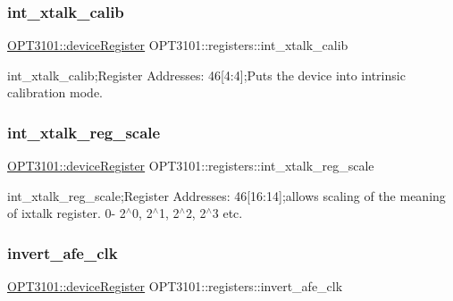 \subsubsection{\texorpdfstring{int\+\_\+xtalk\+\_\+calib}{int\_xtalk\_calib}}
{\footnotesize\ttfamily \mbox{\hyperlink{class_o_p_t3101_1_1device_register}{O\+P\+T3101\+::device\+Register}} O\+P\+T3101\+::registers\+::int\+\_\+xtalk\+\_\+calib}



int\+\_\+xtalk\+\_\+calib;Register Addresses\+: 46\mbox{[}4\+:4\mbox{]};Puts the device into intrinsic calibration mode. 

\mbox{\label{class_o_p_t3101_1_1registers_acff4e2c6f9916202d0e3d82974b15e92}} 
\subsubsection{\texorpdfstring{int\+\_\+xtalk\+\_\+reg\+\_\+scale}{int\_xtalk\_reg\_scale}}
{\footnotesize\ttfamily \mbox{\hyperlink{class_o_p_t3101_1_1device_register}{O\+P\+T3101\+::device\+Register}} O\+P\+T3101\+::registers\+::int\+\_\+xtalk\+\_\+reg\+\_\+scale}



int\+\_\+xtalk\+\_\+reg\+\_\+scale;Register Addresses\+: 46\mbox{[}16\+:14\mbox{]};allows scaling of the meaning of ixtalk register. 0-\/ 2$^\wedge$0, 2$^\wedge$1, 2$^\wedge$2, 2$^\wedge$3 etc. 

\mbox{\label{class_o_p_t3101_1_1registers_a268d16eaac8153c1d761d26f704dadfa}} 
\subsubsection{\texorpdfstring{invert\+\_\+afe\+\_\+clk}{invert\_afe\_clk}}
{\footnotesize\ttfamily \mbox{\hyperlink{class_o_p_t3101_1_1device_register}{O\+P\+T3101\+::device\+Register}} O\+P\+T3101\+::registers\+::invert\+\_\+afe\+\_\+clk}



